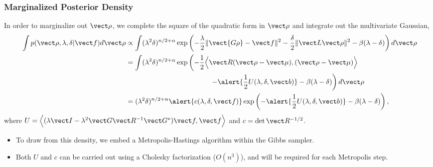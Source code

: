 \documentclass[]{beamer}
\begin{document}
\begin{frame}[t]
\frametitle{Marginalized Posterior Density}
{\footnotesize
In order to marginalize out $\vect \rho$, we \alert{complete the square} of the quadratic form in $\vect \rho$ and integrate out the multivariate Gaussian,
  \begin{align*}
    \int p(\vect \rho,\lambda,\delta|\vect f) d\vect \rho
    &\propto \int (\lambda^2\delta)^{n/2+\alpha} \exp\left(-\frac{\lambda}{2}\|\vect{G\rho} - \vect f\|^2 - \frac{\delta}{2}\|\vect L \vect \rho\|^2 - \beta(\lambda - \delta) \right)d\vect \rho \\
    &= \int(\lambda^2\delta)^{n/2+\alpha}  \exp\left( - \frac 12\Big\langle\vect R(\vect \rho-\vect \mu),(\vect \rho - \vect \mu)\Big\rangle \right.\\
    &\left. \hspace{12em} -\alert{\frac 12U(\lambda,\delta,\vect b)}  -\beta(\lambda - \delta) \right)d\vect \rho\\
    &= (\lambda^2\delta)^{n/2+\alpha}  \alert{ c(\lambda,\delta,\vect f) } \exp\left( -\alert{\frac 12U(\lambda,\delta,\vect b)}  -\beta(\lambda - \delta) \right),
  \end{align*}
  where \alert{$U = \Big\langle (\lambda \vect I - \lambda^2 \vect G\vect R^{-1}\vect G^*)\vect f,\vect f\Big\rangle$} and \alert{$c = \det \vect R ^{-1/2}$}.
\begin{itemize}
  \item To draw from this density, we embed a \alert{Metropolis-Hastings} algorithm within the Gibbs sampler.
  \item Both \alert{$U$} and \alert{$c$} can be carried out using a Cholesky factorization ($O(n^3)$), and will be required for each Metropolis step. 
\end{itemize}
}
\end{frame}
\end{document}
